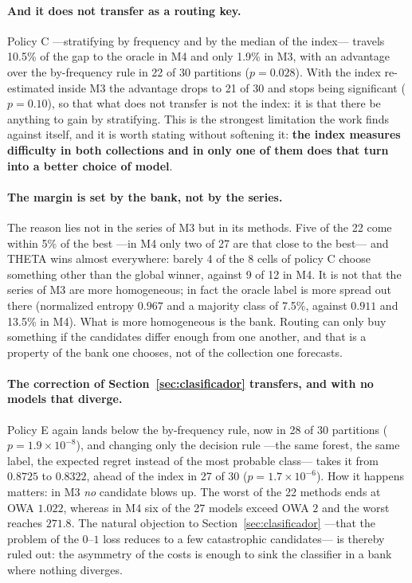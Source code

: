 \paragraph{And it does not transfer as a routing key.} Policy C ---stratifying by
frequency and by the median of the index--- travels 10.5\% of the gap to the oracle in
M4 and only 1.9\% in M3, with an advantage over the by-frequency rule in 22 of 30
partitions ($p=0.028$). With the index re-estimated inside M3 the advantage drops to 21
of 30 and stops being significant ($p=0.10$), so that what does not transfer is not the
index: it is that there be anything to gain by stratifying. This is the strongest
limitation the work finds against itself, and it is worth stating without softening it:
\textbf{the index measures difficulty in both collections and in only one of them does
that turn into a better choice of model}.

\paragraph{The margin is set by the bank, not by the series.} The reason lies not in the
series of M3 but in its methods. Five of the 22 come within 5\% of the best ---in M4
only two of 27 are that close to the best--- and THETA wins almost everywhere: barely 4
of the 8 cells of policy C choose something other than the global winner, against 9 of
12 in M4. It is not that the series of M3 are more homogeneous; in fact the oracle label
is more spread out there (normalized entropy $0.967$ and a majority class of 7.5\%,
against $0.911$ and 13.5\% in M4). What is more homogeneous is the bank. Routing can only
buy something if the candidates differ enough from one another, and that is a property of
the bank one chooses, not of the collection one forecasts.

\paragraph{The correction of Section~\ref{sec:clasificador} transfers, and with no models
that diverge.} Policy E again lands below the by-frequency rule, now in 28 of 30
partitions ($p=1.9\times10^{-8}$), and changing only the decision rule ---the same
forest, the same label, the expected regret instead of the most probable class--- takes
it from $0.8725$ to $0.8322$, ahead of the index in 27 of 30 ($p=1.7\times10^{-6}$). How
it happens matters: in M3 \emph{no} candidate blows up. The worst of the 22 methods ends
at OWA $1.022$, whereas in M4 six of the 27 models exceed OWA $2$ and the worst reaches
$271.8$. The natural objection to Section~\ref{sec:clasificador} ---that the problem of
the $0$--$1$ loss reduces to a few catastrophic candidates--- is thereby ruled out: the
asymmetry of the costs is enough to sink the classifier in a bank where nothing
diverges.

